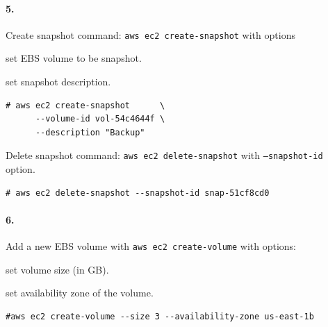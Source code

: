 \documentclass[a4paper]{article}
\begin{document}
\paragraph{5. } Create snapshot command: \texttt{aws ec2 create-snapshot} with options
\begin{description}
\leftskip 0.4in
\parindent -0.4in
	\item[\texttt{--volume-id} : ] set EBS volume to be snapshot.
	\item[\texttt{--description} : ] set snapshot description.
\end{description}
\begin{verbatim}
# aws ec2 create-snapshot      \
      --volume-id vol-54c4644f \
      --description "Backup"
\end{verbatim}

Delete snapshot command: \texttt{aws ec2 delete-snapshot} with \texttt{--snapshot-id} option.
\begin{verbatim}
# aws ec2 delete-snapshot --snapshot-id snap-51cf8cd0
\end{verbatim}


\paragraph{6. } Add a new EBS volume with \texttt{aws ec2 create-volume} with options:
\begin{description}
\leftskip 0.4in
\parindent -0.4in
	\item[\texttt{--size} : ] set volume size (in GB).
	\item[\texttt{--availability-zone} : ] set availability zone of the volume.
\end{description}
\begin{verbatim}
#aws ec2 create-volume --size 3 --availability-zone us-east-1b
\end{verbatim}
\end{document}
